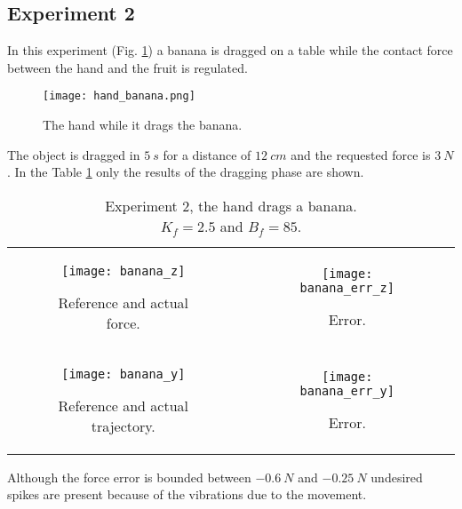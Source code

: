 \subsection{Experiment 2}
In this experiment (Fig. \ref{fig:hand_banana}) a banana is dragged 
on a table while the contact force between the hand and the fruit is regulated.
\begin{figure}[h]
  \centering
  \texttt{[image: hand\_banana.png]}
  \caption{The hand while it drags the banana. \label{fig:hand_banana}}
\end{figure}
The object is dragged in $\SI{5}{s}$ for a distance of $\SI{12}{cm}$ and the requested force is $\SI{3}{N}$.
In the Table \ref{fig:banana} only the results of the dragging phase are shown.
\begin{table}[h]
  \begin{tabular}{cc}
    \begin{subfigure}{0.5\textwidth}
      \centering
      \texttt{[image: banana\_z]}
      \caption{Reference and actual force. \label{fig:banana_z}}
    \end{subfigure}&
    \begin{subfigure}{0.5\textwidth}
      \centering
      \texttt{[image: banana\_err\_z]}
      \caption{Error. \label{fig:banana_error_z}}
    \end{subfigure}\\
    \begin{subfigure}{0.5\textwidth}
      \centering
      \texttt{[image: banana\_y]}
      \caption{Reference and actual trajectory. \label{fig:banana_y}}
    \end{subfigure}&
    \begin{subfigure}{0.5\textwidth}
      \centering
      \texttt{[image: banana\_err\_y]}
      \caption{Error. \label{fig:banana_error_y}}
    \end{subfigure}
  \end{tabular}
  \caption{Experiment 2, the hand drags a banana.\\
  $K_f = 2.5$ and $B_f = 85$.}\label{fig:banana}
\end{table}
Although the force error is bounded between $\SI{-0.6}{N}$ and 
$\SI{-0.25}{N}$ undesired spikes are present because of
the vibrations due to the movement.
\newpage
